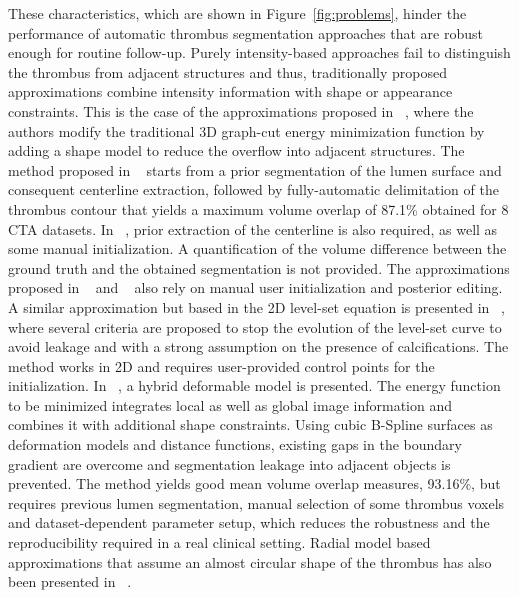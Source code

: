 \documentclass[preprint,authoryear,12pt]{elsarticle}
\begin{document}
These characteristics, which are shown in Figure~\ref{fig:problems}, hinder the performance of automatic thrombus segmentation approaches that are robust enough for routine follow-up. Purely intensity-based approaches fail to distinguish the thrombus from adjacent structures and thus, traditionally proposed approximations combine intensity information with shape or appearance constraints. This is the case of the approximations proposed in ~\citep{Duq12,Egg11,Mot10,kyu10}, where the authors modify the traditional 3D graph-cut energy minimization function by adding a shape model to reduce the overflow into adjacent structures. The method proposed in ~\citep{Mot10} starts from a prior segmentation of the lumen surface and consequent centerline extraction, followed by fully-automatic delimitation of the thrombus contour that yields a maximum volume overlap of 87.1\% obtained for 8 CTA datasets.  In ~\citep{Egg11}, prior extraction of the centerline is also required, as well as some manual initialization. A quantification of the volume difference between the ground truth and the obtained segmentation is not provided. The approximations proposed in ~\citep{Duq12} and ~\citep{kyu10} also rely on manual user initialization and posterior editing. A similar approximation but based in the 2D level-set equation is presented in ~\citep{Zoh12}, where several criteria are proposed to stop the evolution of the level-set curve to avoid leakage and with a strong assumption on the presence of calcifications. The method works in 2D and requires user-provided control points for the initialization. In ~\citep{dem09}, a hybrid deformable model is presented. The energy function to be minimized integrates local as well as global image information and combines it with additional shape constraints. Using cubic B-Spline surfaces as deformation models and distance functions, existing gaps in the boundary gradient are overcome and segmentation leakage into adjacent objects is prevented. The method yields good mean volume overlap measures, 93.16\%, but requires previous lumen segmentation, manual selection of some thrombus voxels and dataset-dependent parameter setup, which reduces the robustness and the reproducibility required in a real clinical setting. Radial model based approximations that assume an almost circular shape of the thrombus has also been presented in ~\citep{Mac09}.  \par
\end{document}
